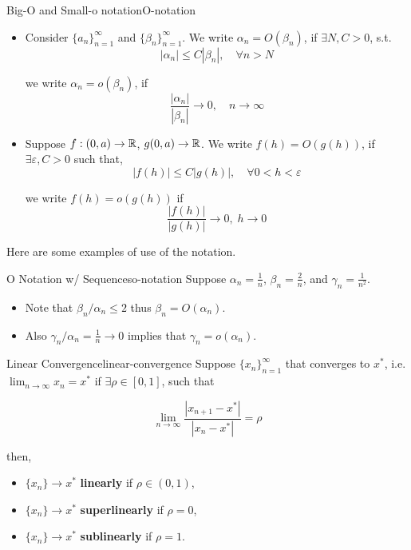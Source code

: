 \documentclass[10pt]{article}
\begin{document}
\begin{mydefinition}{Big-O and Small-o notation}{O-notation}
    \begin{itemize}
        \item Consider $\{a_{n}\}_{n=1}^{\infty}$ and $\{\beta_{n}\}_{n=1}^{\infty}$. We write $\alpha_n = O(\beta_n)$, if $\exists N, C >0$, s.t. 
        \[
        |\alpha_n|\leq C|\beta_n |, \quad \forall n>N
        \]

        we write $\alpha_n = o(\beta_n)$, if 
        \[
        \frac{|\alpha_n|}{|\beta_n|}\to 0, \quad n\to \infty
        \]
    \item Suppose $f:(0,a)\to \mathbb{R}$, $g(0,a)\to\mathbb{R}$. We write $f(h)=O(g(h))$, if $\exists \varepsilon, C >0$ such that,
    \[
    |f(h)| \leq C|g(h)|, \quad\forall 0<h<\varepsilon
    \]

    we write $f(h)=o(g(h))$ if 
    \[
    \frac{|f(h)|}{|g(h)|} \to 0, \; h\to 0
    \]
    \end{itemize}
\end{mydefinition}

Here are some examples of use of the notation.

\begin{myexample}{O Notation w/ Sequences}{o-notation}
    Suppose $\alpha_{n}=\frac{1}{n}$, $\beta_{n}=\frac{2}{n}$, and $\gamma_{n}=\frac{1}{n^{2}}$. 

    \begin{itemize}
        \item Note that $\beta_{n}/\alpha_{n}\leq 2$ thus $\beta_{n}=O(\alpha_{n})$.
        \item Also $\gamma_{n}/ \alpha_{n} = \frac{1}{n}\to 0$ implies that $\gamma_{n}=o(\alpha_{n})$.
    \end{itemize}
\end{myexample}

\begin{mydefinition}{Linear Convergence}{linear-convergence}
    Suppose $\{x_{n}\}_{n=1}^{\infty}$ that converges to $x^{*}$, i.e. $\lim_{n\to \infty}x_{n} = x^{*}$ if $\exists\rho\in[0,1]$, such that

    \[
    \lim_{n\to\infty}\frac{|x_{n+1}-x^*|}{|x_{n}-x^*|}=\rho
    \]

    then,

    \begin{itemize}
        \item $\{x_n\}\to x^*$ \textbf{linearly} if $\rho\in(0,1)$,
        \item $\{x_n\} \to x^*$ \textbf{superlinearly} if $\rho =0$,
        \item $\{x_n\} \to x^*$ \textbf{sublinearly} if $\rho = 1$.
    \end{itemize}
\end{mydefinition}
\end{document}
